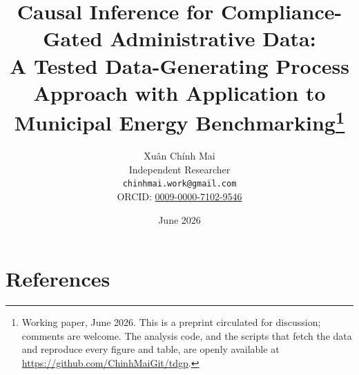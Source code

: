 \documentclass[11pt,a4paper]{article}
\title{Causal Inference for Compliance-Gated Administrative Data:\\
A Tested Data-Generating Process Approach with Application to Municipal Energy Benchmarking\thanks{Working paper, June 2026. This is a preprint circulated for discussion; comments are welcome. The analysis code, and the scripts that fetch the data and reproduce every figure and table, are openly available at \url{https://github.com/ChinhMaiGit/tdgp}.}}
\author{Xuân Chính Mai\\[2pt]
{\small Independent Researcher}\\[2pt]
{\small\texttt{chinhmai.work@gmail.com}}\\[2pt]
{\small ORCID: \href{https://orcid.org/0009-0000-7102-9546}{0009-0000-7102-9546}}}
\date{June 2026}
\begin{document}
\maketitle

\sloppy











\clearpage
\section*{References}

\end{document}
